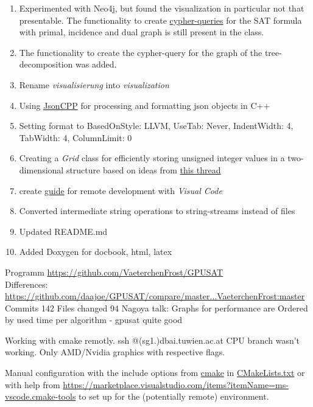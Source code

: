 \documentclass[a4paper, 12pt, bibliography=totoc]{scrartcl}
\begin{document}
\begin{enumerate}
	\item Experimented with Neo4j, but found the visualization in particular not that presentable. The functionality to create \href{https://neo4j.com/developer/cypher-resources/}{cypher-queries} for the SAT formula with primal, incidence and dual graph is still present in the class.
	\item The functionality to create the cypher-query for the graph of the tree-decomposition was added.
	\item Rename \textit{visualisierung} into \textit{visualization}
	\item Using \href{https://github.com/open-source-parsers/jsoncpp}{JsonCPP} for processing and formatting json objects in C++
	\item Setting format to {BasedOnStyle: LLVM, UseTab: Never, IndentWidth: 4, TabWidth: 4, ColumnLimit: 0}
	\item Creating a \emph{Grid} class for efficiently storing unsigned integer values in a two-dimensional structure
	based on ideas from \href{https://stackoverflow.com/questions/936687}{this thread}
	\item create \href{https://github.com/VaeterchenFrost/GPUSAT/blob/master/VisualCodeUsage.md}{guide} for remote development with \emph{Visual Code}
	\item Converted intermediate string operations to string-streams instead of files
	\item Updated README.md
	\item Added Doxygen for docbook, html, latex	
\end{enumerate}
Programm \url{https://github.com/VaeterchenFrost/GPUSAT} \\
Differences: \url{https://github.com/daajoe/GPUSAT/compare/master...VaeterchenFrost:master}  Commits 142 Files changed 94 
Nagoya talk:
Graphs for performance are Ordered by used time per algorithm - gpusat quite good

Working with cmake remotly. ssh @(sg1.)dbai.tuwien.ac.at
CPU branch wasn't working.
Only AMD/Nvidia graphics  with respective flags.

Manual configuration with the include options from \href{https://cmake.org/}{cmake} in \href{https://github.com/VaeterchenFrost/GPUSAT/blob/master/CMakeLists.txt}{CMakeLists.txt}
or with help from \url{https://marketplace.visualstudio.com/items?itemName=ms-vscode.cmake-tools}
to set up for the (potentially remote) environment.
\end{document}
